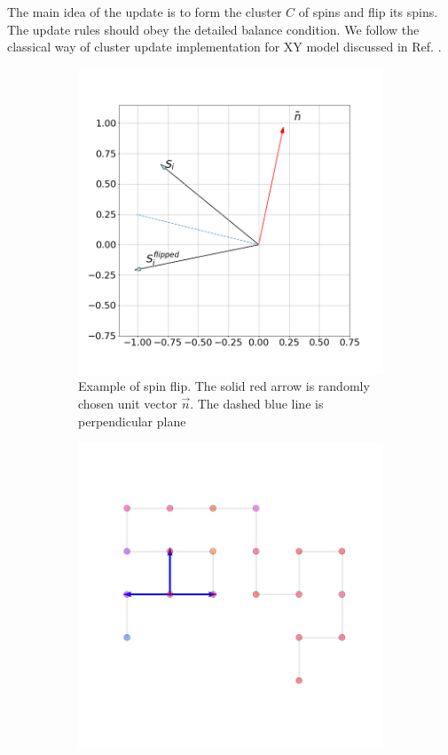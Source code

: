 The main idea of the update is to form the cluster $C$ of spins and flip its spins. The update rules should obey the detailed balance condition. We follow the classical way of cluster update implementation for XY model discussed in Ref. \cite{newman1999monte}. 

  \begin{figure}
	\centering
	\captionsetup{justification=centering}
	\begin{subfigure}[b]{0.45\textwidth}
		\includegraphics[width=\textwidth]{Images/cluster_flip.png}
		\caption{ Example of spin flip. The solid red arrow is randomly chosen unit vector $\vec{n}$. The dashed blue line is perpendicular plane  }
		\label{fig:clusterflip}
	\end{subfigure}
	\begin{subfigure}[b]{0.45\textwidth}
		\includegraphics[width=\textwidth]{Images/state_example_cluster.png}

\end{subfigure}
\end{figure}
